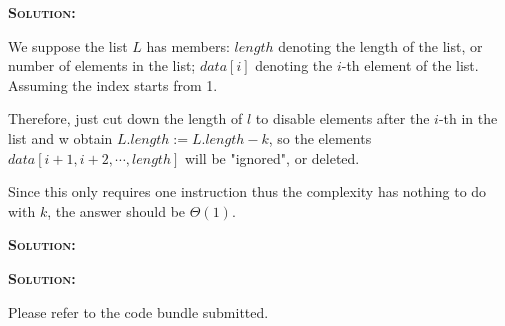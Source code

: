 \documentclass[answers]{exam}
\renewenvironment{solution}{\textsc{\textbf{Solution:}} \par}{}
\begin{document}
\begin{questions}

	\question
	\begin{solution}
		We suppose the list $L$ has members: $length$ denoting the length of the list, or number of elements in the list; $data[i]$ denoting the $i$-th element of the list. Assuming the index starts from 1.

		Therefore, just cut down the length of $l$ to disable elements after the $i$-th in the list and w obtain $L.length := L.length-k$,
		so the elements $data[i+1, i+2, \cdots, length]$ will be "ignored", or deleted.

		Since this only requires one instruction thus the complexity has nothing to do with $k$, the answer should be $\Theta(1)$.

	\end{solution}

	\question

	\question
	\begin{solution}
	\end{solution}



	\question
	\begin{solution}
		Please refer to the code bundle submitted.
	\end{solution}
\end{questions}
\end{document}
